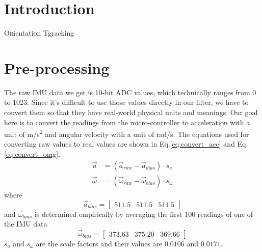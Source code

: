 \documentclass[twoside]{article}
\begin{document}
\begin{multicols}{2} %

\section{Introduction}
\lettrine[nindent=0em,lines=2]{O}rientation Tgracking


\section{Pre-processing}
The raw IMU data we get is 10-bit ADC values, which technically ranges from 0 to 1023. Since it's difficult to use those values directly in our filter, we have to convert them so that they have real-world physical units and meanings. Our goal here is to convert the readings from the micro-controller to acceleration with a unit of \si{m/s^2} and angular velocity with a unit of \si{\radian/s}.
The equations used for converting raw values to real values are shown in Eq.\ref{eq:convert_acc} and Eq.\ref{eq:convert_omg}.
\begin{align}
\label{eq:convert_acc}
\vec{a} &= (\vec{a}_{raw} - \vec{a}_{bias}) \cdot s_{a}\\
\vec{\omega} &= (\vec{\omega}_{raw} - \vec{\omega}_{bias}) \cdot s_{\omega}
\label{eq:convert_omg}
\end{align}
where 
\begin{equation}
\vec{a}_{bias} = \begin{bmatrix}511.5 & 511.5 & 511.5\end{bmatrix}
\end{equation}
and $\vec{\omega}_{bias}$ is determined empirically by averaging the first 100 readings of one of the IMU data
\begin{equation}
\vec{\omega}_{bias} = \begin{bmatrix}373.63 & 375.20 & 369.66\end{bmatrix}
\end{equation}
$s_{a}$ and $s_{\omega}$ are the scale factors and their values are $0.0106$ and $0.0171$.


\end{multicols}
\end{document}
